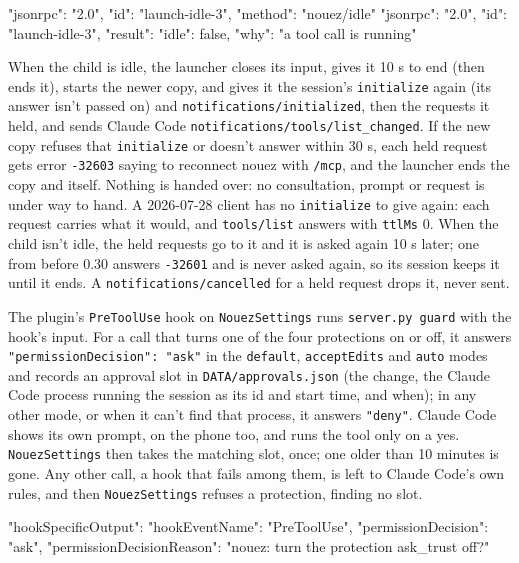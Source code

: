 \documentclass[10pt,a4paper]{article}
\newcommand{\code}[1]{\texttt{#1}}
\begin{document}
\begin{wire}
{"jsonrpc": "2.0", "id": "launch-idle-3", "method": "nouez/idle"}
{"jsonrpc": "2.0", "id": "launch-idle-3", "result": {"idle": false, "why": "a tool call is running"}}
\end{wire}

When the child is idle, the launcher closes its input, gives it 10 s to end (then ends it), starts
the newer copy, and gives it the session's \code{initialize} again (its answer isn't passed on)
and \code{notifications/initialized}, then the requests it held, and sends Claude Code
\code{notifications/tools/list\_changed}. If the new copy refuses that \code{initialize} or
doesn't answer within 30 s, each held request gets error \code{-32603} saying to reconnect nouez
with \code{/mcp}, and the launcher ends the copy and itself. Nothing is handed over: no consultation, prompt or
request is under way to hand. A 2026-07-28 client has no \code{initialize} to give again: each
request carries what it would, and \code{tools/list} answers with \code{ttlMs} 0. When the child
isn't idle, the held requests go to it and it is asked again 10 s later; one from before 0.30
answers \code{-32601} and is never asked again, so its session keeps it until it ends. A
\code{notifications/cancelled} for a held request drops it, never sent.

The plugin's \code{PreToolUse} hook on \code{NouezSettings} runs \code{server.py guard} with the
hook's input. For a call that turns one of the four protections on or off, it answers
\code{"permissionDecision": "ask"} in the \code{default}, \code{acceptEdits} and \code{auto} modes
and records an approval slot in \code{DATA/approvals.json} (the change, the Claude Code process
running the session as its id and start time, and when); in any other mode, or when it can't find
that process, it answers \code{"deny"}. Claude Code shows its own prompt, on the phone too, and runs
the tool only on a yes. \code{NouezSettings} then takes the matching slot, once; one older than 10
minutes is gone. Any other call, a hook that fails among them, is left to Claude Code's own rules,
and then \code{NouezSettings} refuses a protection, finding no slot.

\begin{wire}
{"hookSpecificOutput": {"hookEventName": "PreToolUse", "permissionDecision": "ask",
  "permissionDecisionReason": "nouez: turn the protection ask_trust off?"}}
\end{wire}
\end{document}

